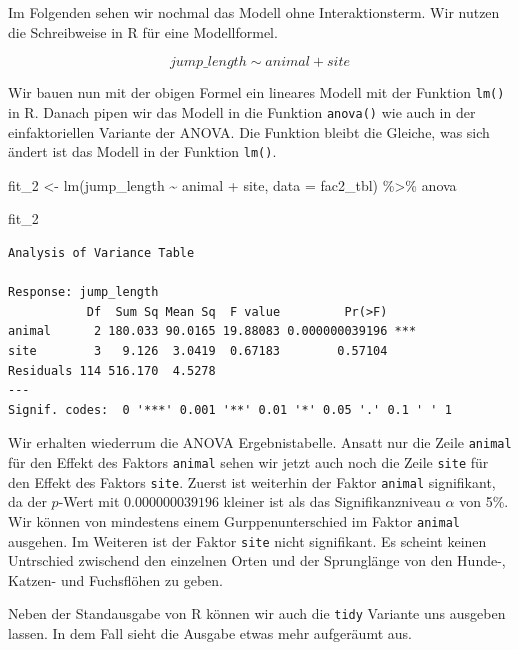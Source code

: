 \documentclass[
  letterpaper,
  DIV=11,
  oneside]{scrreport}
\newenvironment{Shaded}{\begin{snugshade}}{\end{snugshade}}
\newcommand{\AttributeTok}[1]{\textcolor[rgb]{0.40,0.45,0.13}{#1}}
\newcommand{\FunctionTok}[1]{\textcolor[rgb]{0.28,0.35,0.67}{#1}}
\newcommand{\NormalTok}[1]{\textcolor[rgb]{0.00,0.23,0.31}{#1}}
\newcommand{\OtherTok}[1]{\textcolor[rgb]{0.00,0.23,0.31}{#1}}
\newcommand{\SpecialCharTok}[1]{\textcolor[rgb]{0.37,0.37,0.37}{#1}}
\begin{document}
Im Folgenden sehen wir nochmal das Modell ohne Interaktionsterm. Wir
nutzen die Schreibweise in R für eine Modellformel.

\[
jump\_length \sim animal + site
\]

Wir bauen nun mit der obigen Formel ein lineares Modell mit der Funktion
\texttt{lm()} in R. Danach pipen wir das Modell in die Funktion
\texttt{anova()} wie auch in der einfaktoriellen Variante der ANOVA. Die
Funktion bleibt die Gleiche, was sich ändert ist das Modell in der
Funktion \texttt{lm()}.

\begin{Shaded}
\begin{Highlighting}[]
\NormalTok{fit\_2 }\OtherTok{\textless{}{-}}  \FunctionTok{lm}\NormalTok{(jump\_length }\SpecialCharTok{\textasciitilde{}}\NormalTok{ animal }\SpecialCharTok{+}\NormalTok{ site, }\AttributeTok{data =}\NormalTok{ fac2\_tbl) }\SpecialCharTok{\%\textgreater{}\%} 
\NormalTok{  anova}

\NormalTok{fit\_2}
\end{Highlighting}
\end{Shaded}

\begin{verbatim}
Analysis of Variance Table

Response: jump_length
           Df  Sum Sq Mean Sq  F value         Pr(>F)    
animal      2 180.033 90.0165 19.88083 0.000000039196 ***
site        3   9.126  3.0419  0.67183        0.57104    
Residuals 114 516.170  4.5278                            
---
Signif. codes:  0 '***' 0.001 '**' 0.01 '*' 0.05 '.' 0.1 ' ' 1
\end{verbatim}

Wir erhalten wiederrum die ANOVA Ergebnistabelle. Ansatt nur die Zeile
\texttt{animal} für den Effekt des Faktors \texttt{animal} sehen wir
jetzt auch noch die Zeile \texttt{site} für den Effekt des Faktors
\texttt{site}. Zuerst ist weiterhin der Faktor \texttt{animal}
signifikant, da der \(p\)-Wert mit \(0.000000039196\) kleiner ist als
das Signifikanzniveau \(\alpha\) von 5\%. Wir können von mindestens
einem Gurppenunterschied im Faktor \texttt{animal} ausgehen. Im Weiteren
ist der Faktor \texttt{site} nicht signifikant. Es scheint keinen
Untrschied zwischend den einzelnen Orten und der Sprunglänge von den
Hunde-, Katzen- und Fuchsflöhen zu geben.

Neben der Standausgabe von R können wir auch die \texttt{tidy} Variante
uns ausgeben lassen. In dem Fall sieht die Ausgabe etwas mehr aufgeräumt
aus.
\end{document}
